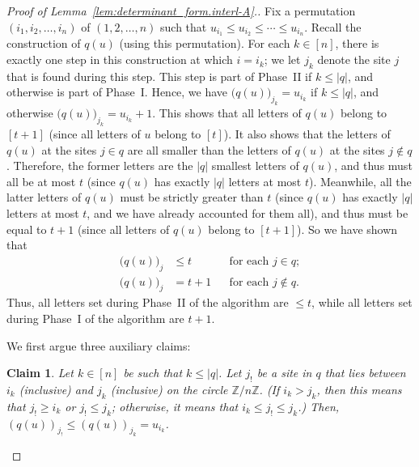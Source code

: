 \documentclass[reqno]{amsart}
\newcommand{\0}{\phantom{c}}
\newcommand{\abs}[1]{\left| #1 \right|}
\newcommand{\tup}[1]{\left( #1 \right)}
\newcommand{\ive}[1]{\left[ #1 \right]}
\theoremstyle{plain}
\newtheorem{claim}[thm]{Claim}
\theoremstyle{definition}
\numberwithin{equation}{section}
\begin{document}
\begin{proof}[Proof of Lemma~\ref{lem:determinant_form.interl-A}.]
Fix a permutation $\tup{i_1, i_2, \dotsc, i_n}$ of $\tup{1, 2, \dotsc, n}$ such that $u_{i_1}\leq u_{i_2}\leq \cdots \leq u_{i_n}$.
Recall the construction of $q(u)$ (using this permutation).
For each $k \in \ive{n}$, there is exactly one step in this construction at which $i = i_k$; we let $j_k$ denote the site $j$ that is found during this step.
This step is part of Phase~II if $k \leq \abs{q}$, and otherwise is part of Phase~I.
Hence, we have $\bigl( q(u) \bigr)_{j_k}=u_{i_k}$ if $k\leq \abs{q}$, and otherwise $\bigl( q(u) \bigr)_{j_k} = u_{i_k}+1$.
This shows that all letters of $q(u)$ belong to $\ive{t+1}$ (since all letters of $u$ belong to $\ive{t}$).
It also shows that the letters of $q(u)$ at the sites $j \in q$ are all smaller than the letters of $q(u)$ at the sites $j \notin q$.
Therefore, the former letters are the $\abs{q}$ smallest letters of $q(u)$, and thus must all be at most $t$ (since $q(u)$ has exactly $\abs{q}$ letters at most $t$).
Meanwhile, all the latter letters of $q(u)$ must be strictly greater than $t$ (since $q(u)$ has exactly $\abs{q}$ letters at most $t$, and we have already accounted for them all), and thus must be equal to $t+1$ (since all letters of $q(u)$ belong to $\ive{t+1}$).
So we have shown that
\begin{subequations}
\begin{align}
\label{pf.lem:determinant_form.interl-A.1}
\bigl( q(u) \bigr)_j  & \leq t && \text{for each } j \in q;
\\
\label{pf.lem:determinant_form.interl-A.2}
\bigl( q(u) \bigr)_j  & = t+1 && \text{for each } j \notin q.
\end{align}
\end{subequations}
Thus, all letters set during Phase~II of the algorithm are $\leq t$,
while all letters set during Phase~I of the algorithm are $t+1$.


We first argue three auxiliary claims:

\begin{claim}
\label{claim:little_interlacing}
Let $k\in \ive{n} $ be such that $k\leq \left\vert
q\right\vert $. Let $j_{!}$ be a site in $q$ that lies between $i_k$
(inclusive) and $j_k$ (inclusive) on the circle $\mathbb{Z}/n\mathbb{Z}$.
(If $i_k>j_k$, then this means that $j_{!}\geq i_k$ or $j_{!}\leq j_k
$; otherwise, it means that $i_k\leq j_{!}\leq j_k$.) Then, $\left(
q(u) \right) _{j_{!}}\leq \left( q(u) \right)
_{j_k}=u_{i_k}$.
\end{claim}


\end{proof}
\end{document}
